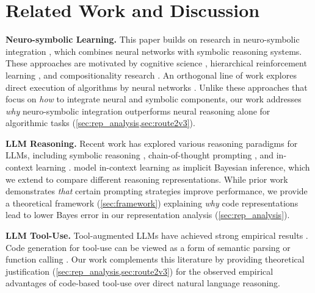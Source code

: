 \section{Related Work and Discussion}
\label{sec:related_work}

\textbf{Neuro-symbolic Learning.} This paper builds on research in neuro-symbolic integration \cite{graves_neural_2014, velickovic_neural_2021, reed_neural_2016, graves_hybrid_2016}, which combines neural networks with symbolic reasoning systems. These approaches are motivated by cognitive science \cite{schneider_controlled_2003, risko_cognitive_2016, anderson_neural_2010}, hierarchical reinforcement learning \cite{kolter_hierarchical_2007, dietterich_hierarchical_2000}, and compositionality research \cite{hudson_compositional_2018, hupkes_compositionality_2020, andreas_neural_2017, poggio2017and}. An orthogonal line of work explores direct execution of algorithms by neural networks \cite{velickovic_neural_2021, mahdavi_towards_2023, ibarz_generalist_2022, yan_neural_2020}. Unlike these approaches that focus on \emph{how} to integrate neural and symbolic components, our work addresses \emph{why} neuro-symbolic integration outperforms neural reasoning alone for algorithmic tasks (\cref{sec:rep_analysis,sec:route2v3}).

\textbf{LLM Reasoning.} Recent work has explored various reasoning paradigms for LLMs, including symbolic reasoning \cite{marra_integrating_2019, olausson_linc_2023, han_folio_2024}, chain-of-thought prompting \cite{wei2022chain, zelikman_star_2022, merrill_expressive_2024, altabaa_cot_2025}, and in-context learning \cite{xie2021explanation, garg2022can, akyurek2022learning, zhang2024trained}. \citet{xie2021explanation} model in-context learning as implicit Bayesian inference, which we extend to compare different reasoning representations. While prior work demonstrates \emph{that} certain prompting strategies improve performance, we provide a theoretical framework (\cref{sec:framework}) explaining \emph{why} code representations lead to lower Bayes error in our representation analysis (\cref{sec:rep_analysis}).

\textbf{LLM Tool-Use.} Tool-augmented LLMs have achieved strong empirical results \cite{shen_llm_2024, 10.5555/3666122.3669119, qin_toolllm_2023, tang_toolalpaca_2023, parisi_talm_2022}. Code generation for tool-use can be viewed as a form of semantic parsing \cite{shin_few-shot_2022, krishnamurthy_neural_2017, berant_semantic_2013, dong_language_2016} or function calling \cite{puri_codenet_2021, alon_code2vec_2019, chen_neural_2018}. Our work complements this literature by providing theoretical justification (\cref{sec:rep_analysis,sec:route2v3}) for the observed empirical advantages of code-based tool-use over direct natural language reasoning. 

